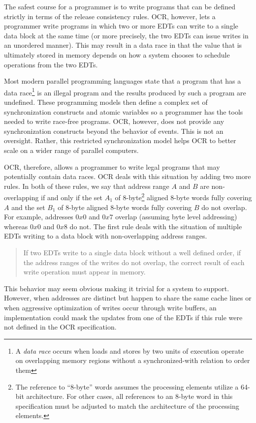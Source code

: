 The safest course for a programmer is to write programs that can be
defined strictly in terms of the release consistency rules. OCR,
however, lets a programmer write programs in which two or more EDTs can
write to a single data block at the same time (or more precisely, the
two EDTs can issue writes in an unordered manner). This may result in a
data race in that the value that is ultimately stored
in memory depends on how a system chooses to schedule operations from
the two EDTs.

Most modern parallel programming languages state that a program that
has a data race\footnote{A \emph{data race} occurs when loads and
stores by two units of execution operate on overlapping memory regions
without a synchronized-with relation to order them} is an illegal
program and the results produced by such a program are undefined.
These programming models then define a complex set of synchronization
constructs and atomic variables so a programmer has the tools needed
to write race-free programs. OCR, however, does not provide any
synchronization constructs beyond the behavior of events. This is not
an oversight. Rather, this restricted synchronization model helps OCR
to better scale on a wider range of parallel computers.

OCR, therefore, allows a programmer to write legal programs that may
potentially contain data races. OCR deals with this situation by
adding two more rules. In both of these rules, we say that address
range $A$ and $B$ are non-overlapping if and only if the set $A_1$ of
8-byte\footnote{The reference to ``8-byte'' words assumes the processing elements
utilize a 64-bit architecture.  For other cases, all references to an 8-byte
word in this specification must be adjusted to match the architecture of the processing elements.}
aligned 8-byte words fully covering $A$ and the set $B_1$ of
8-byte aligned 8-byte words fully covering $B$ do not overlap. For
example, addresses
$0x0$ and $0x7$ overlap (assuming byte level addressing) whereas
$0x0$ and $0x8$ do not.
The first rule deals with the situation of multiple
EDTs writing to a data block with non-overlapping address ranges.
\begin{quote}
If two EDTs write to a single data block without a well defined order,
if the address ranges of the writes do not overlap, the correct result
of each write operation must appear in memory.
\end{quote}

This behavior may seem obvious making it trivial for a system to
support. However, when addresses are distinct but happen to share the
same cache lines or when aggressive optimization of writes occur
through write buffers, an implementation could mask the updates from
one of the EDTs if this rule were not defined in the OCR
specification.

